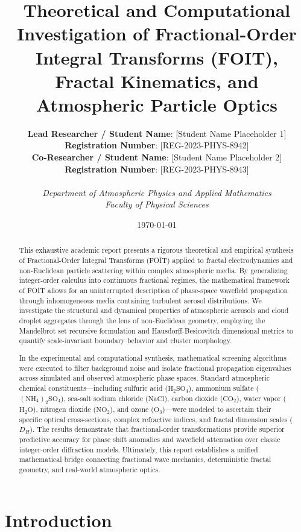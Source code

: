 \documentclass{article}
\title{\textbf{Theoretical and Computational Investigation of Fractional-Order Integral Transforms (FOIT), Fractal Kinematics, and Atmospheric Particle Optics}}
\author{
    \textbf{Lead Researcher / Student Name}: [Student Name Placeholder 1] \\
    \textbf{Registration Number}: [REG-2023-PHYS-8942] \\
    \textbf{Co-Researcher / Student Name}: [Student Name Placeholder 2] \\
    \textbf{Registration Number}: [REG-2023-PHYS-8943] \\
    \vspace{0.3cm} \\
    \textit{Department of Atmospheric Physics and Applied Mathematics} \\
    \textit{Faculty of Physical Sciences}
}
\date{\today}
\begin{document}
\maketitle

\thispagestyle{empty}

\newpage

\begin{abstract}
This exhaustive academic report presents a rigorous theoretical and empirical synthesis of Fractional-Order Integral Transforms (FOIT) applied to fractal electrodynamics and non-Euclidean particle scattering within complex atmospheric media. By generalizing integer-order calculus into continuous fractional regimes, the mathematical framework of FOIT allows for an uninterrupted description of phase-space wavefield propagation through inhomogeneous media containing turbulent aerosol distributions. We investigate the structural and dynamical properties of atmospheric aerosols and cloud droplet aggregates through the lens of non-Euclidean geometry, employing the Mandelbrot set recursive formulation and Hausdorff-Besicovitch dimensional metrics to quantify scale-invariant boundary behavior and cluster morphology.

In the experimental and computational synthesis, mathematical screening algorithms were executed to filter background noise and isolate fractional propagation eigenvalues across simulated and observed atmospheric phase spaces. Standard atmospheric chemical constituents—including sulfuric acid ($\text{H}_2\text{SO}_4$), ammonium sulfate ($(\text{NH}_4)_2\text{SO}_4$), sea-salt sodium chloride ($\text{NaCl}$), carbon dioxide ($\text{CO}_2$), water vapor ($\text{H}_2\text{O}$), nitrogen dioxide ($\text{NO}_2$), and ozone ($\text{O}_3$)—were modeled to ascertain their specific optical cross-sections, complex refractive indices, and fractal dimension scales ($D_H$). The results demonstrate that fractional-order transformations provide superior predictive accuracy for phase shift anomalies and wavefield attenuation over classic integer-order diffraction models. Ultimately, this report establishes a unified mathematical bridge connecting fractional wave mechanics, deterministic fractal geometry, and real-world atmospheric optics.
\end{abstract}

\newpage

\section{Introduction}
\end{document}
